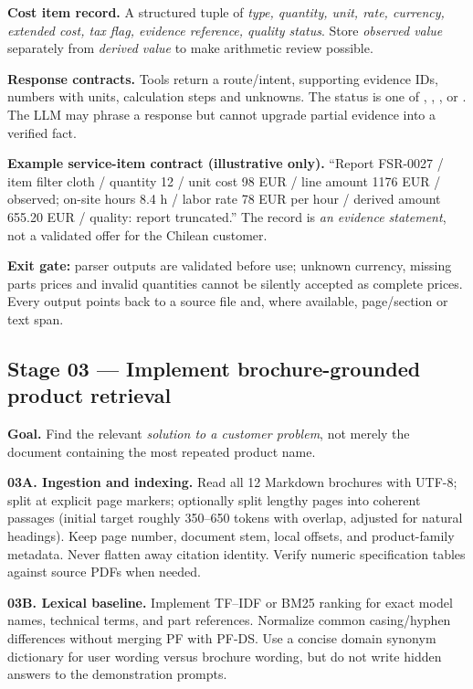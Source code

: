 \documentclass[11pt,a4paper]{article}
\DeclareRobustCommand{\code}[1]{{\ttfamily\small\detokenize{#1}}}
\begin{document}
\textbf{Cost item record.} A structured tuple of \emph{type, quantity, unit, rate, currency, extended cost, tax flag, evidence reference, quality status}. Store \emph{observed value} separately from \emph{derived value} to make arithmetic review possible.

\textbf{Response contracts.} Tools return a route/intent, supporting evidence IDs, numbers with units, calculation steps and unknowns. The status is one of \code{SUPPORTED}, \code{PARTIAL}, \code{INSUFFICIENT}, or \code{CONFLICTING}. The LLM may phrase a response but cannot upgrade partial evidence into a verified fact.

\begin{examplebox}
\textbf{Example service-item contract (illustrative only).} ``Report FSR-0027 / item filter cloth / quantity 12 / unit cost 98 EUR / line amount 1176 EUR / observed; on-site hours 8.4 h / labor rate 78 EUR per hour / derived amount 655.20 EUR / quality: report truncated.'' The record is \emph{an evidence statement}, not a validated offer for the Chilean customer.
\end{examplebox}

\textbf{Exit gate:} parser outputs are validated before use; unknown currency, missing parts prices and invalid quantities cannot be silently accepted as complete prices. Every output points back to a source file and, where available, page/section or text span.

\subsection{Stage 03 --- Implement brochure-grounded product retrieval}
\textbf{Goal.} Find the relevant \emph{solution to a customer problem}, not merely the document containing the most repeated product name.

\textbf{03A. Ingestion and indexing.} Read all 12 Markdown brochures with UTF-8; split at explicit page markers; optionally split lengthy pages into coherent passages (initial target roughly 350--650 tokens with overlap, adjusted for natural headings). Keep page number, document stem, local offsets, and product-family metadata. Never flatten away citation identity. Verify numeric specification tables against source PDFs when needed.

\textbf{03B. Lexical baseline.} Implement TF--IDF or BM25 ranking for exact model names, technical terms, and part references. Normalize common casing/hyphen differences without merging PF with PF-DS. Use a concise domain synonym dictionary for user wording versus brochure wording, but do not write hidden answers to the demonstration prompts.
\end{document}
